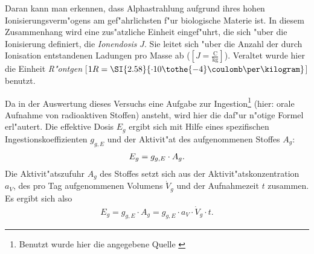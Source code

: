 \documentclass[12pt]{article}
\begin{document}
Daran kann man erkennen, dass Alphastrahlung aufgrund ihres hohen Ionisierungsverm"ogens am gef"ahrlichsten f"ur biologische Materie ist. In diesem Zusammenhang wird eine zus"atzliche Einheit eingef"uhrt, die sich "uber die Ionisierung definiert, die \textit{Ionendosis} $J$. Sie leitet sich "uber die Anzahl der durch Ionisation entstandenen Ladungen pro Masse ab ($[J=\frac{\si{\coulomb}}{\si{\kilogram}}]$). Veraltet wurde hier die Einheit \textit{R"ontgen} [$1R=\SI{2.58}{\cdot10\tothe{-4}\coulomb\per\kilogram}$] benutzt. \par 
Da in der Auswertung dieses Versuchs eine Aufgabe zur Ingestion\footnote{Benutzt wurde hier die angegebene Quelle \cite{vogt-schulz}} (hier: orale Aufnahme von radioaktiven Stoffen) ansteht, wird hier die daf"ur n"otige Formel erl"autert. Die effektive Dosis $E_g$ ergibt sich mit Hilfe eines spezifischen Ingestionskoeffizienten $g_{g,E}$ und der Aktivit"at des aufgenommenen Stoffes $A_g$:
\begin{align}
E_g=g_{g,E}\cdot A_g. \notag
\end{align}
Die Aktivit"atszufuhr $A_g$ des Stoffes setzt sich aus der Aktivit"atskonzentration $a_V$, des pro Tag aufgenommenen Volumens $\dot{V}_g$ und der Aufnahmezeit $t$ zusammen. Es ergibt sich also
\begin{align}
E_g=g_{g,E}\cdot A_g=g_{g,E}\cdot a_V\cdot \dot{V}_g \cdot t.
\label{eq:ingestion}
\end{align} 
\end{document}
